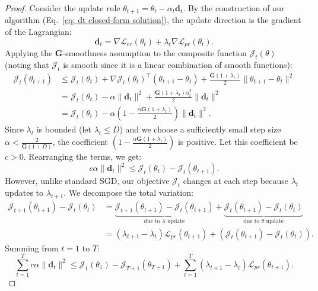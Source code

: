 \begin{proof}
Consider the update rule $\theta_{t+1} = \theta_t - \alpha_t \mathbf{d}_t$. By the construction of our algorithm (Eq.~\ref{eq: dt closed-form solution}), the update direction is the gradient of the Lagrangian:
\begin{equation}
    \mathbf{d}_t = \nabla \mathcal{L}_{er}(\theta_t) + \lambda_t \nabla \mathcal{L}_{pr}(\theta_t).
\end{equation}
Applying the $\mathbf{G}$-smoothness assumption to the composite function $\mathcal{J}_t(\theta)$ (noting that $\mathcal{J}_t$ is smooth since it is a linear combination of smooth functions):
\begin{align}
    \mathcal{J}_t(\theta_{t+1}) &\le \mathcal{J}_t(\theta_t) + \nabla \mathcal{J}_t(\theta_t)^\top (\theta_{t+1} - \theta_t) + \frac{\mathbf{G}(1+\lambda_t)}{2} \|\theta_{t+1} - \theta_t\|^2 \\
    &= \mathcal{J}_t(\theta_t) - \alpha \|\mathbf{d}_t\|^2 + \frac{\mathbf{G}(1+\lambda_t)\alpha_t^2}{2} \|\mathbf{d}_t\|^2 \\
    &= \mathcal{J}_t(\theta_t) - \alpha \left( 1 - \frac{\alpha \mathbf{G}(1+\lambda_t)}{2} \right) \|\mathbf{d}_t\|^2.
\end{align}
Since $\lambda_t$ is bounded (let $\lambda_t \le D$) and we choose a sufficiently small step size $\alpha < \frac{2}{\mathbf{G}(1+D)}$, the coefficient $\left( 1 - \frac{\alpha \mathbf{G}(1+\lambda_t)}{2} \right)$ is positive. Let this coefficient be $c > 0$. Rearranging the terms, we get:
\begin{equation}
    c \alpha \|\mathbf{d}_t\|^2 \le \mathcal{J}_t(\theta_t) - \mathcal{J}_t(\theta_{t+1}).
\end{equation}
However, unlike standard SGD, our objective $\mathcal{J}_t$ changes at each step because $\lambda_t$ updates to $\lambda_{t+1}$. We decompose the total variation:
\begin{align}
    \mathcal{J}_{t+1}(\theta_{t+1}) - \mathcal{J}_t(\theta_t) &= \underbrace{\mathcal{J}_{t+1}(\theta_{t+1}) - \mathcal{J}_t(\theta_{t+1})}_{\text{due to } \lambda \text{ update}} + \underbrace{\mathcal{J}_t(\theta_{t+1}) - \mathcal{J}_t(\theta_t)}_{\text{due to } \theta \text{ update}} \\
    &= (\lambda_{t+1} - \lambda_t)\mathcal{L}_{pr}(\theta_{t+1}) + (\mathcal{J}_t(\theta_{t+1}) - \mathcal{J}_t(\theta_t)).
\end{align}
Summing from $t=1$ to $T$:
\begin{equation}
    \sum_{t=1}^T c \alpha \|\mathbf{d}_t\|^2 \le \mathcal{J}_1(\theta_1) - \mathcal{J}_{T+1}(\theta_{T+1}) + \sum_{t=1}^T (\lambda_{t+1} - \lambda_t)\mathcal{L}_{pr}(\theta_{t+1}).

\end{equation}
\end{proof}

